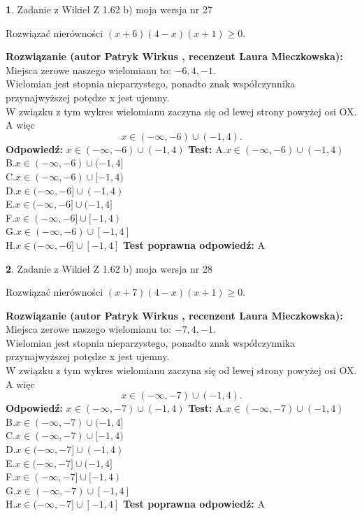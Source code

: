 \documentclass[12pt, a4paper]{article}
\theoremstyle{definition} %
\newtheorem{zad}{}
\newcommand{\zadStart}[1]{\begin{zad}#1\newline}
\newcommand{\zadStop}{\end{zad}}
\newcommand{\rozwStart}[2]{\noindent \textbf{Rozwiązanie (autor #1 , recenzent #2): }\newline}
\newcommand{\rozwStop}{\newline}
\newcommand{\odpStart}{\noindent \textbf{Odpowiedź:}\newline}
\newcommand{\odpStop}{\newline}
\newcommand{\testStart}{\noindent \textbf{Test:}\newline}
\newcommand{\testStop}{\newline}
\newcommand{\kluczStart}{\noindent \textbf{Test poprawna odpowiedź:}\newline}
\newcommand{\kluczStop}{\newline}
\begin{document}
\zadStart{Zadanie z Wikieł Z 1.62 b) moja wersja nr 27}

Rozwiązać nierówności $(x+6)(4-x)(x+1)\ge0$.
\zadStop
\rozwStart{Patryk Wirkus}{Laura Mieczkowska}
Miejsca zerowe naszego wielomianu to: $-6, 4, -1$.\\
Wielomian jest stopnia nieparzystego, ponadto znak współczynnika przy\linebreak najwyższej potędze x jest ujemny.\\ W związku z tym wykres wielomianu zaczyna się od lewej strony powyżej osi OX. A więc $$x \in (-\infty,-6) \cup (-1,4).$$
\rozwStop
\odpStart
$x \in (-\infty,-6) \cup (-1,4)$
\odpStop
\testStart
A.$x \in (-\infty,-6) \cup (-1,4)$\\
B.$x \in (-\infty,-6) \cup (-1,4]$\\
C.$x \in (-\infty,-6) \cup [-1,4)$\\
D.$x \in (-\infty,-6] \cup (-1,4)$\\
E.$x \in (-\infty,-6] \cup (-1,4]$\\
F.$x \in (-\infty,-6] \cup [-1,4)$\\
G.$x \in (-\infty,-6) \cup [-1,4]$\\
H.$x \in (-\infty,-6] \cup [-1,4]$
\testStop
\kluczStart
A
\kluczStop



\zadStart{Zadanie z Wikieł Z 1.62 b) moja wersja nr 28}

Rozwiązać nierówności $(x+7)(4-x)(x+1)\ge0$.
\zadStop
\rozwStart{Patryk Wirkus}{Laura Mieczkowska}
Miejsca zerowe naszego wielomianu to: $-7, 4, -1$.\\
Wielomian jest stopnia nieparzystego, ponadto znak współczynnika przy\linebreak najwyższej potędze x jest ujemny.\\ W związku z tym wykres wielomianu zaczyna się od lewej strony powyżej osi OX. A więc $$x \in (-\infty,-7) \cup (-1,4).$$
\rozwStop
\odpStart
$x \in (-\infty,-7) \cup (-1,4)$
\odpStop
\testStart
A.$x \in (-\infty,-7) \cup (-1,4)$\\
B.$x \in (-\infty,-7) \cup (-1,4]$\\
C.$x \in (-\infty,-7) \cup [-1,4)$\\
D.$x \in (-\infty,-7] \cup (-1,4)$\\
E.$x \in (-\infty,-7] \cup (-1,4]$\\
F.$x \in (-\infty,-7] \cup [-1,4)$\\
G.$x \in (-\infty,-7) \cup [-1,4]$\\
H.$x \in (-\infty,-7] \cup [-1,4]$
\testStop
\kluczStart
A
\kluczStop
\end{document}
